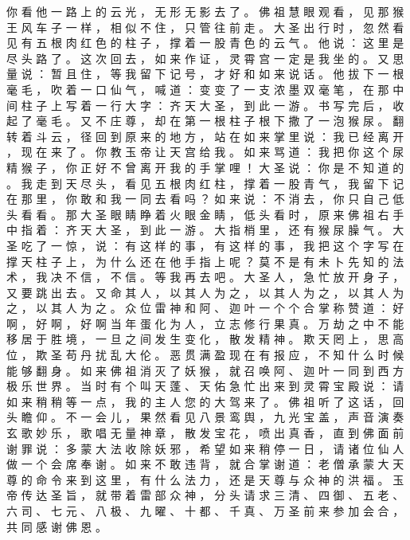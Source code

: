 {你 看 他 一 路 上 的 云 光 ， 无 形 无 影 去 了 。
佛 祖 慧 眼 观 看 ， 见 那 猴 王 风 车 子 一 样 ， 相 似 不 住 ， 只 管 往 前 走 。
大 圣 出 行 时 ， 忽 然 看 见 有 五 根 肉 红 色 的 柱 子 ， 撑 着 一 股 青 色 的 云 气 。
他 说 ： 这 里 是 尽 头 路 了 。
这 次 回 去 ， 如 来 作 证 ， 灵 霄 宫 一 定 是 我 坐 的 。
又 思 量 说 ： 暂 且 住 ， 等 我 留 下 记 号 ， 才 好 和 如 来 说 话 。
他 拔 下 一 根 毫 毛 ， 吹 着 一 口 仙 气 ， 喊 道 ： 变 变 了 一 支 浓 墨 双 毫 笔 ， 在 那 中 间 柱 子 上 写 着 一 行 大 字 ： 齐 天 大 圣 ， 到 此 一 游 。
书 写 完 后 ， 收 起 了 毫 毛 。
又 不 庄 尊 ， 却 在 第 一 根 柱 子 根 下 撒 了 一 泡 猴 尿 。
翻 转 着 斗 云 ， 径 回 到 原 来 的 地 方 ， 站 在 如 来 掌 里 说 ： 我 已 经 离 开 ， 现 在 来 了 。
你 教 玉 帝 让 天 宫 给 我 。
如 来 骂 道 ： 我 把 你 这 个 尿 精 猴 子 ， 你 正 好 不 曾 离 开 我 的 手 掌 哩 ！
大 圣 说 ： 你 是 不 知 道 的 。
我 走 到 天 尽 头 ， 看 见 五 根 肉 红 柱 ， 撑 着 一 股 青 气 ， 我 留 下 记 在 那 里 ， 你 敢 和 我 一 同 去 看 吗 ？ 如 来 说 ： 不 消 去 ， 你 只 自 己 低 头 看 看 。
那 大 圣 眼 睛 睁 着 火 眼 金 睛 ， 低 头 看 时 ， 原 来 佛 祖 右 手 中 指 着 ： 齐 天 大 圣 ， 到 此 一 游 。
大 指 梢 里 ， 还 有 猴 尿 臊 气 。
大 圣 吃 了 一 惊 ， 说 ： 有 这 样 的 事 ， 有 这 样 的 事 ， 我 把 这 个 字 写 在 撑 天 柱 子 上 ， 为 什 么 还 在 他 手 指 上 呢 ？ 莫 不 是 有 未 卜 先 知 的 法 术 ， 我 决 不 信 ， 不 信 。
等 我 再 去 吧 。
大 圣 人 ， 急 忙 放 开 身 子 ， 又 要 跳 出 去 。
又 命 其 人 ， 以 其 人 为 之 ， 以 其 人 为 之 ， 以 其 人 为 之 ， 以 其 人 为 之 。
众 位 雷 神 和 阿 、 迦 叶 一 个 个 合 掌 称 赞 道 ： 好 啊 ， 好 啊 ， 好 啊 当 年 蛋 化 为 人 ， 立 志 修 行 果 真 。
万 劫 之 中 不 能 移 居 于 胜 境 ， 一 旦 之 间 发 生 变 化 ， 散 发 精 神 。
欺 天 罔 上 ， 思 高 位 ， 欺 圣 苟 丹 扰 乱 大 伦 。
恶 贯 满 盈 现 在 有 报 应 ， 不 知 什 么 时 候 能 够 翻 身 。
如 来 佛 祖 消 灭 了 妖 猴 ， 就 召 唤 阿 、 迦 叶 一 同 到 西 方 极 乐 世 界 。
当 时 有 个 叫 天 蓬 、 天 佑 急 忙 出 来 到 灵 霄 宝 殿 说 ： 请 如 来 稍 稍 等 一 点 ， 我 的 主 人 您 的 大 驾 来 了 。
佛 祖 听 了 这 话 ， 回 头 瞻 仰 。
不 一 会 儿 ， 果 然 看 见 八 景 鸾 舆 ， 九 光 宝 盖 ， 声 音 演 奏 玄 歌 妙 乐 ， 歌 唱 无 量 神 章 ， 散 发 宝 花 ， 喷 出 真 香 ， 直 到 佛 面 前 谢 罪 说 ： 多 蒙 大 法 收 除 妖 邪 ， 希 望 如 来 稍 停 一 日 ， 请 诸 位 仙 人 做 一 个 会 席 奉 谢 。
如 来 不 敢 违 背 ， 就 合 掌 谢 道 ： 老 僧 承 蒙 大 天 尊 的 命 令 来 到 这 里 ， 有 什 么 法 力 ， 还 是 天 尊 与 众 神 的 洪 福 。
玉 帝 传 达 圣 旨 ， 就 带 着 雷 部 众 神 ， 分 头 请 求 三 清 、 四 御 、 五 老 、 六 司 、 七 元 、 八 极 、 九 曜 、 十 都 、 千 真 、 万 圣 前 来 参 加 会 合 ， 共 同 感 谢 佛 恩 。
}
